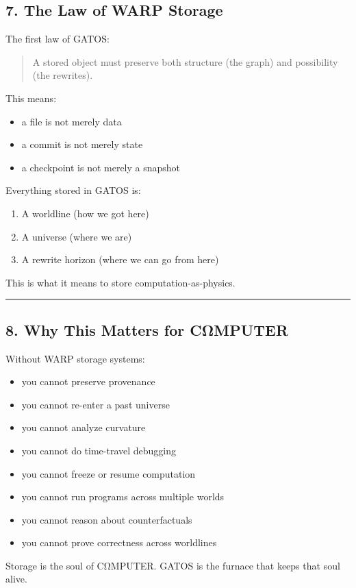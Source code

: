 \subsection{7. The Law of WARP Storage}\label{the-law-of-rmg-storage}

The first law of GATOS:

\begin{quote}
A stored object must preserve both structure (the graph) and possibility
(the rewrites).
\end{quote}

This means:

\begin{itemize}
\tightlist
\item
  a file is not merely data
\item
  a commit is not merely state
\item
  a checkpoint is not merely a snapshot
\end{itemize}

Everything stored in GATOS is:

\begin{enumerate}
\def\labelenumi{\arabic{enumi}.}
\tightlist
\item
  A worldline (how we got here)
\item
  A universe (where we are)
\item
  A rewrite horizon (where we can go from here)
\end{enumerate}

This is what it means to store computation-as-physics.

\begin{center}\rule{0.5\linewidth}{0.5pt}\end{center}

\subsection{8. Why This Matters for
CΩMPUTER}\label{why-this-matters-for-cux3c9mputer}

Without WARP storage systems:

\begin{itemize}
\tightlist
\item
  you cannot preserve provenance
\item
  you cannot re-enter a past universe
\item
  you cannot analyze curvature
\item
  you cannot do time-travel debugging
\item
  you cannot freeze or resume computation
\item
  you cannot run programs across multiple worlds
\item
  you cannot reason about counterfactuals
\item
  you cannot prove correctness across worldlines
\end{itemize}

Storage is the soul of CΩMPUTER. GATOS is the furnace that keeps that
soul alive.
